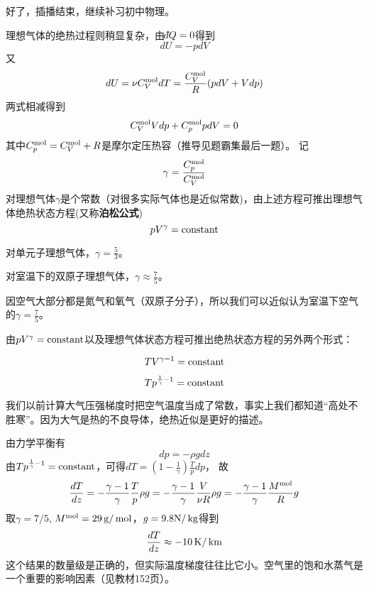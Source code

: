 \documentclass[CJK]{beamer}
\begin{document}
\begin{frame}
\bch

好了，插播结束，继续补习初中物理。

\ech
\end{frame}


\begin{frame}
\bch
{\small
理想气体的绝热过程则稍显复杂，由$\dbar Q=0$得到
$$ dU = -p dV$$
又$$ dU = \nu C_V^{\rm mol} dT = \frac{C_V^{\rm mol}}{R}(p dV + V dp)$$
两式相减得到
$$ C_V^{\rm mol} Vdp + C_p^{\rm mol} p dV = 0$$
其中$C_p^{\rm mol} = C_V^{\rm mol} + R$是摩尔定压热容（推导见题霸集最后一题）。
记$$\gamma = \frac{C_p^{\rm mol}}{C_V^{\rm mol}}$$
对理想气体$\gamma$是个常数（对很多实际气体也是近似常数)，由上述方程可推出{\blue 理想气体绝热状态方程}(又称{\bf 泊松公式})
{\blue 
$$p V^\gamma = \mathrm{constant}$$}
}
\ech
\end{frame}


\begin{frame}
\bch
{\small
对单元子理想气体，$\gamma = \frac{5}{3}$。

\skipline

对室温下的双原子理想气体，$\gamma \approx \frac{7}{5}$。

\skipline

因空气大部分都是氮气和氧气（双原子分子），所以我们可以近似认为室温下空气的$\gamma = \frac{7}{5}$。
}

由$pV^\gamma = \mathrm{constant} $以及理想气体状态方程可推出绝热状态方程的另外两个形式：

$$ TV^{\gamma-1} = \mathrm{constant}$$

$$T p^{\frac{1}{\gamma}-1} = \mathrm{constant} $$
\ech
\end{frame}


\begin{frame}
\bch
{\small 
我们以前计算大气压强梯度时把空气温度当成了常数，事实上我们都知道“高处不胜寒”。因为大气是热的不良导体，绝热近似是更好的描述。

由力学平衡有
$$dp = -\rho g dz$$
由$Tp^{\frac{1}{\gamma}-1}= \mathrm{constant}$，可得$dT = \left(1-\frac{1}{\gamma}\right)\frac{T}{p} dp $，
故
$$\frac{dT}{dz} = -\frac{\gamma - 1}{\gamma} \frac{T}{p}\rho g= -\frac{\gamma - 1}{\gamma} \frac{V}{\nu R}\rho g =  -\frac{\gamma - 1}{\gamma} \frac{M^{\rm mol}}{ R} g$$
取$\gamma  = 7/5$, $M^{\rm mol} = 29\,\mathrm{g}/\,\mathrm{mol}$，$g = 9.8 \mathrm{N}/\,\mathrm{kg}$得到
$$\frac{dT}{dz} \approx -10\,\mathrm{K}/\,\mathrm{km}$$
这个结果的数量级是正确的，但实际温度梯度往往比它小。空气里的饱和水蒸气是一个重要的影响因素（见教材152页）。
}
\ech
\end{frame}
\end{document}
